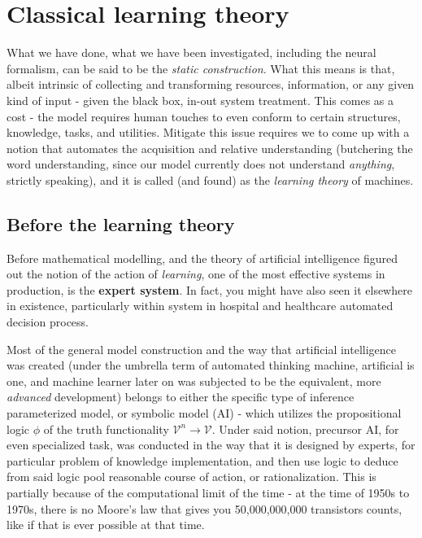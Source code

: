 \chapter{Classical learning theory}
What we have done, what we have been investigated, including the neural formalism, can be said to be the \textit{static construction}. What this means is that, albeit intrinsic of collecting and transforming resources, information, or any given kind of input - given the black box, in-out system treatment. This comes as a cost - the model requires human touches to even conform to certain structures, knowledge, tasks, and utilities. Mitigate this issue requires we to come up with a notion that automates the acquisition and relative understanding (butchering the word understanding, since our model currently does not understand \textit{anything}, strictly speaking), and it is called (and found) as the \textit{learning theory} of machines. 

\section{Before the learning theory}

Before mathematical modelling, and the theory of artificial intelligence figured out the notion of the action of \textit{learning}, one of the most effective systems in production, is the \textbf{expert system}. In fact, you might have also seen it elsewhere in existence, particularly within system in hospital and healthcare automated decision process. 

Most of the general model construction and the way that artificial intelligence was created (under the umbrella term of automated thinking machine, artificial is one, and machine learner later on was subjected to be the equivalent, more \textit{advanced} development) belongs to either the specific type of inference parameterized model, or symbolic model (AI) - which utilizes the propositional logic $\phi$ of the truth functionality $\mathcal{V}^{n}\to \mathcal{V}$. Under said notion, precursor AI, for even specialized task, was conducted in the way that it is designed by experts, for particular problem of knowledge implementation, and then use logic to deduce from said logic pool reasonable course of action, or rationalization. This is partially because of the computational limit of the time - at the time of 1950s to 1970s, there is no Moore's law that gives you 50,000,000,000 transistors counts, like if that is ever possible at that time. 

